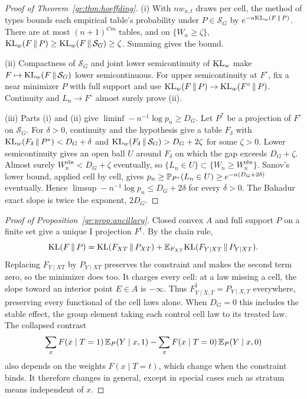 \begin{proof}[Proof of Theorem~\ref{gr:thm:hoeffding}]
(i) With $nw_{x,t}$ draws per cell, the method of types bounds each empirical table's probability under $P\in\mathcal S_G$ by $e^{-n\mathrm{KL}_w(F\,\|\,P)}$. There are at most $(n+1)^{Cm}$ tables, and on $\{W_n\ge\zeta\}$, $\mathrm{KL}_w(F\,\|\,P)\ge\mathrm{KL}_w(F\,\|\,\mathcal S_G)\ge\zeta$. Summing gives the bound.

(ii) Compactness of $\mathcal S_G$ and joint lower semicontinuity of $\mathrm{KL}_w$ make $F\mapsto\mathrm{KL}_w(F\,\|\,\mathcal S_G)$ lower semicontinuous. For upper semicontinuity at $F^\circ$, fix a near minimizer $P$ with full support and use $\mathrm{KL}_w(F\,\|\,P)\to\mathrm{KL}_w(F^\circ\,\|\,P)$. Continuity and $L_n\to F^\circ$ almost surely prove (ii).

(iii) Parts (i) and (ii) give $\liminf-n^{-1}\log p_n\ge D_G$. Let $P^*$ be a projection of $F^\circ$ on $\mathcal S_G$. For $\delta>0$, continuity and the hypothesis give a table $F_\delta$ with $\mathrm{KL}_w(F_\delta\,\|\,P^*)<D_G+\delta$ and $\mathrm{KL}_w(F_\delta\,\|\,\mathcal S_G)>D_G+2\zeta$ for some $\zeta>0$. Lower semicontinuity gives an open ball $U$ around $F_\delta$ on which the gap exceeds $D_G+\zeta$. Almost surely $W_n^{\mathrm{obs}}<D_G+\zeta$ eventually, so $\{L_n\in U\}\subset\{W_n\ge W_n^{\mathrm{obs}}\}$. Sanov's lower bound, applied cell by cell, gives $p_n\ge\mathbb{P}_{P^*}(L_n\in U)\ge e^{-n(D_G+2\delta)}$ eventually. Hence $\limsup-n^{-1}\log p_n\le D_G+2\delta$ for every $\delta>0$. The Bahadur exact slope is twice the exponent, $2D_G$.
\end{proof}

\begin{proof}[Proof of Proposition~\ref{gr:prop:ancillary}]
Closed convex $A$ and full support $P$ on a finite set give a unique I projection $F^\dagger$. By the chain rule,
\[
\mathrm{KL}(F\,\|\,P)=\mathrm{KL}(F_{XT}\,\|\,P_{XT})+\mathbb{E}_{F_{XT}}\mathrm{KL}(F_{Y\mid XT}\,\|\,P_{Y\mid XT}).
\]
Replacing $F_{Y\mid XT}$ by $P_{Y\mid XT}$ preserves the constraint and makes the second term zero, so the minimizer does too. It charges every cell: at a law missing a cell, the slope toward an interior point $E\in A$ is $-\infty$. Thus $F^\dagger_{Y\mid X,T}=P_{Y\mid X,T}$ everywhere, preserving every functional of the cell laws alone. When $D_G=0$ this includes the stable effect, the group element taking each control cell law to its treated law. The collapsed contrast
\[
\sum_xF(x\mid T=1)\,\mathbb{E}_P(Y\mid x,1)-\sum_xF(x\mid T=0)\,\mathbb{E}_P(Y\mid x,0)
\]
also depends on the weights $F(x\mid T=t)$, which change when the constraint binds. It therefore changes in general, except in special cases such as stratum means independent of $x$.
\end{proof}

